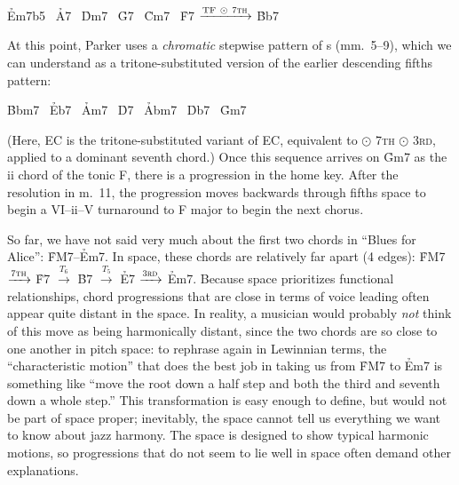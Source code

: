 {\begin{center}
  \h{Em7b5} \TFarrow\ \h{A7} \ECarrow\
  \h{Dm7}   \TFarrow\ \h{G7} \ECarrow\
  \h{Cm7}   \TFarrow\ \h{F7} $\xrightarrow{\mathrm{TF}\ \odot\ \text{\textsc{7th}}}$
  \h{Bb7}
\end{center}


At this point, Parker uses a \emph{chromatic} stepwise pattern of \tf{}s
(mm.~5--9), which we can understand as a tritone-substituted version of the
earlier descending fifths pattern:

\begin{center}
  \h{Bbm7} \TFTarrow\ \h{Eb7} \ECTarrow\
  \h{Am7}  \TFTarrow\ \h{D7}  \ECTarrow\
  \h{Abm7} \TFTarrow\ \h{Db7} \ECTarrow\
  \h{Gm7}
\end{center}

\noindent (Here, EC\tsub{T} is the tritone-substituted variant of EC,
equivalent to \tft $\odot$ \textsc{7th} $\odot$ \textsc{3rd}, applied to a
dominant seventh chord.) Once this sequence arrives on \h{Gm7} as the ii chord
of the tonic F, there is a \tfo progression in the home key. After the
resolution in m.~11, the progression moves backwards through fifths space to
begin a VI--ii--V turnaround to F major to begin the next chorus.

So far, we have not said very much about the first two chords in ``Blues for
Alice'': \h{FM7}--\h{Em7}. In \tf space, these chords are relatively far
apart (4 edges): \h{FM7} $\xrightarrow{\text{\textsc{7th}}}$ \h{F7} $\xrightarrow{T_6}$
\h{B7} $\xrightarrow{T_5}$ \h{E7} $\xrightarrow{\text{\textsc{3rd}}}$ \h{Em7}.
Because \tf space prioritizes functional relationships, chord progressions
that are close in terms of voice leading often appear quite distant in the
space. In reality, a musician would probably \emph{not} think of this move as
being harmonically distant, since the two chords are so close to one another
in pitch space: to rephrase again in Lewinnian terms, the ``characteristic
motion'' that does the best job in taking us from \h{FM7} to \h{Em7} is
something like ``move the root down a half step and both the third and seventh
down a whole step.'' This transformation is easy enough to define, but would
not be part of \tf space proper; inevitably, the space cannot tell us
everything we want to know about jazz harmony. The space is designed to show
typical harmonic motions, so progressions that do not seem to lie well in \tf
space often demand other explanations.

}

